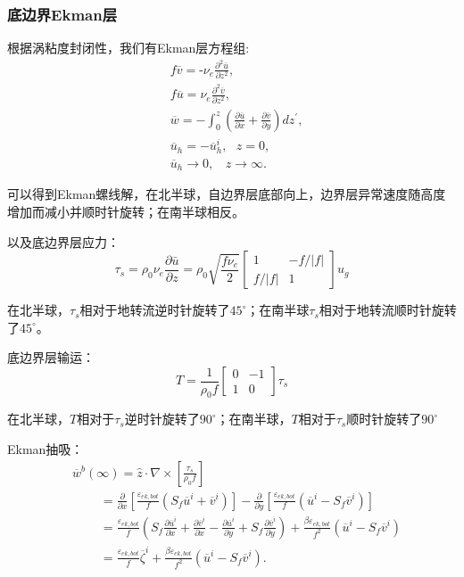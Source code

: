 \documentclass{article}
\begin{document}
\subsubsection{底边界Ekman层}
根据涡粘度封闭性，我们有Ekman层方程组:
\begin{align}
  & f\overline{v}=\text{-}{{\nu }_{e}}\frac{{{\partial }^{2}}\overline{u}}{\partial {{z}^{2}}}, \\ 
 & f\overline{u}={{\nu }_{e}}\frac{{{\partial }^{2}}\overline{v}}{\partial {{z}^{2}}}, \\ 
 & \overline{w}=-\int_{0}^{z}{(\frac{\partial \overline{u}}{\partial x}+\frac{\partial \overline{v}}{\partial y})}d{z}^{\prime}, \\ 
 & {{\overline{u}}_{h}}=-\overline{u}_{h}^{i},\ \ \ z=0, \\ 
 & {{\overline{u}}_{h}}\to 0,\ \ \ \ z\to \infty .\ \ \ \  
\end{align}

可以得到Ekman螺线解，在北半球，自边界层底部向上，边界层异常速度随高度增加而减小并顺时针旋转；在南半球相反。

以及底边界层应力：
$$\tau_s=\rho_0\nu_e\frac{\partial\bar{u}}{\partial z}=\rho_0\sqrt{\frac{f\nu_e}{2}}\begin{bmatrix}
    1&-f/|f|\\
    f/|f|& 1
\end{bmatrix}u_g$$

在北半球，$\tau_s$相对于地转流逆时针旋转了$45^{\circ}$；在南半球$\tau_s$相对于地转流顺时针旋转了$45^{\circ}$。

底边界层输运：
$$T=\frac{1}{\rho_0f}\begin{bmatrix}
    0&-1\\
    1& 0
\end{bmatrix}\tau_s$$

在北半球，$T$相对于$\tau_s$逆时针旋转了$90^{\circ}$；在南半球，$T$相对于$\tau_s$顺时针旋转了$90^{\circ}$

Ekman抽吸：
\begin{align}
  & {{\overline{w}}^{b}}(\infty )=\widehat{z}\cdot \nabla \times \left[ \frac{{{\tau }_{s}}}{{{\rho }_{0}}f} \right] \\ 
 & \ \ \ \ \ \ \ \ \ \ =\frac{\partial }{\partial x}\left[\frac{{{\varepsilon }_{ek,bot}}}{f}({{S}_{f}}{{\overline{u}}^{i}}+{{\overline{v}}^{i}})\right]-\frac{\partial }{\partial y}\left[\frac{{{\varepsilon }_{ek,bot}}}{f}({{\overline{u}}^{i}}-{{S}_{f}}{{\overline{v}}^{i}})\right] \\ 
 & \ \ \ \ \ \ \ \ \ \ =\frac{{{\varepsilon }_{ek,bot}}}{f}({{S}_{f}}\frac{\partial {{\overline{u}}^{i}}}{\partial x}+\frac{\partial {{\overline{v}}^{i}}}{\partial x}-\frac{\partial {{\overline{u}}^{i}}}{\partial y}+{{S}_{f}}\frac{\partial {{\overline{v}}^{i}}}{\partial y})+\frac{\beta {{\varepsilon }_{ek,bot}}}{{{f}^{2}}}({{\overline{u}}^{i}}-{{S}_{f}}{{\overline{v}}^{i}}) \\ 
 & \ \ \ \ \ \ \ \ \ \ =\frac{{{\varepsilon }_{ek,bot}}}{f}{{\overline{\zeta }}^{i}}+\frac{\beta {{\varepsilon }_{ek,bot}}}{{{f}^{2}}}({{\overline{u}}^{i}}-{{S}_{f}}{{\overline{v}}^{i}}).\ \ \ \  
\end{align}
\end{document}
